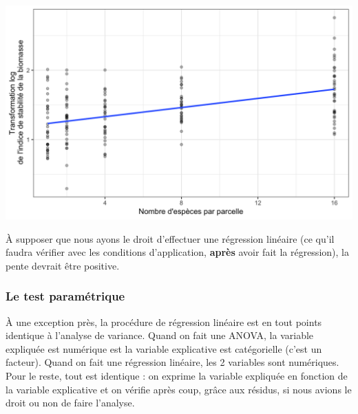 \documentclass[a4paperpaper,]{article}
\newenvironment{Shaded}{\begin{snugshade}}{\end{snugshade}}
\newcommand{\CharTok}[1]{\textcolor[rgb]{0.57,0.30,0.62}{#1}}
\newcommand{\DataTypeTok}[1]{\textcolor[rgb]{0.00,0.34,0.68}{#1}}
\newcommand{\FloatTok}[1]{\textcolor[rgb]{0.69,0.50,0.00}{#1}}
\newcommand{\KeywordTok}[1]{\textcolor[rgb]{0.12,0.11,0.11}{\textbf{#1}}}
\newcommand{\NormalTok}[1]{\textcolor[rgb]{0.12,0.11,0.11}{#1}}
\newcommand{\OperatorTok}[1]{\textcolor[rgb]{0.12,0.11,0.11}{#1}}
\newcommand{\OtherTok}[1]{\textcolor[rgb]{0.00,0.43,0.16}{#1}}
\newcommand{\StringTok}[1]{\textcolor[rgb]{0.75,0.01,0.01}{#1}}
\begin{document}
\begin{Shaded}
\end{Shaded}

\begin{center}\includegraphics[width=0.9\linewidth]{figure/unnamed-chunk-117-1} \end{center}

À supposer que nous ayons le droit d'effectuer une régression linéaire (ce qu'il faudra vérifier avec les conditions d'application, \textbf{après} avoir fait la régression), la pente devrait être positive.

\hypertarget{le-test-parametrique-5}{%
\subsubsection{Le test paramétrique}\label{le-test-parametrique-5}}

À une exception près, la procédure de régression linéaire est en tout points identique à l'analyse de variance. Quand on fait une ANOVA, la variable expliquée est numérique est la variable explicative est catégorielle (c'est un facteur). Quand on fait une régression linéaire, les 2 variables sont numériques. Pour le reste, tout est identique : on exprime la variable expliquée en fonction de la variable explicative et on vérifie après coup, grâce aux résidus, si nous avions le droit ou non de faire l'analyse.
\end{document}
